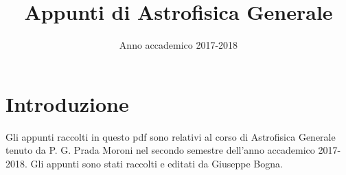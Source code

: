 \documentclass[a4paper,11pt]{report}
\title{Appunti di Astrofisica Generale}
\author{Anno accademico 2017-2018}
\date{}
\theoremstyle{theorem}
\theoremstyle{definition}
\begin{document}
	\maketitle
	\section*{Introduzione}
	Gli appunti raccolti in questo pdf sono relativi al corso di Astrofisica Generale tenuto da P. G. Prada Moroni nel secondo semestre dell'anno accademico 2017-2018. Gli appunti sono stati raccolti e editati da Giuseppe Bogna.
	\tableofcontents
			
\end{document}
